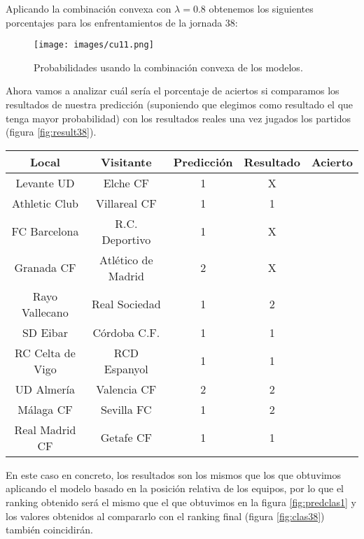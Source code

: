 Aplicando la combinación convexa con $\lambda=0.8$ obtenemos los siguientes porcentajes para los enfrentamientos de la jornada 38:

\begin{figure}[H]
	\centering
	\texttt{[image: images/cu11.png]}
	\caption{Probabilidades usando la combinación convexa de los modelos.}
\end{figure}

Ahora vamos a analizar cuál sería el porcentaje de aciertos si comparamos los resultados de nuestra predicción (suponiendo que elegimos como resultado el que tenga mayor probabilidad) con los resultados reales una vez jugados los partidos (figura \ref{fig:result38}).

\begin{center}
	\begin{tabular}{|c|c|c|c|c|}
		\hline \rowcolor{ao} Local & Visitante & Predicción & Resultado & Acierto \\ 
		\hline Levante UD & Elche CF & 1 & X & \begingroup\color{red}\xmark\endgroup \\ 
		\hline Athletic Club & Villareal CF & 1 & 1 & \begingroup\color{green}\cmark\endgroup \\ 
		\hline FC Barcelona & R.C. Deportivo & 1 & X & \begingroup\color{red}\xmark\endgroup \\ 
		\hline Granada CF & Atlético de Madrid & 2 & X & \begingroup\color{red}\xmark\endgroup \\ 
		\hline Rayo Vallecano & Real Sociedad & 1 & 2 & \begingroup\color{red}\xmark\endgroup \\ 
		\hline SD Eibar & Córdoba C.F. & 1 & 1 & \begingroup\color{green}\cmark\endgroup \\ 
		\hline RC Celta de Vigo & RCD Espanyol & 1 & 1 & \begingroup\color{green}\cmark\endgroup \\ 
		\hline UD Almería & Valencia CF & 2 & 2 & \begingroup\color{green}\cmark\endgroup \\ 
		\hline Málaga CF & Sevilla FC & 1 & 2 & \begingroup\color{red}\xmark\endgroup \\ 
		\hline Real Madrid CF & Getafe CF & 1 & 1 & \begingroup\color{green}\cmark\endgroup \\ 
		\hline 
	\end{tabular} 
\end{center}

En este caso en concreto, los resultados son los mismos que los que obtuvimos aplicando el modelo basado en la posición relativa de los equipos, por lo que el ranking obtenido será el mismo que el que obtuvimos en la figura \ref{fig:predclas1} y los valores obtenidos al compararlo con el ranking final (figura \ref{fig:clas38}) también coincidirán.\\

